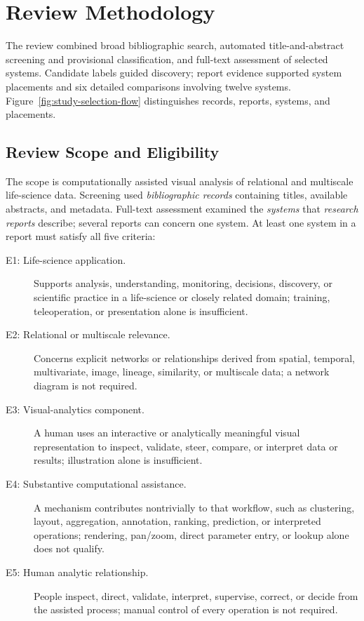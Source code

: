 \section{Review Methodology}
\label{sec:methodology}
The review combined broad bibliographic search, automated title-and-abstract screening and provisional classification, and full-text assessment of selected systems. Candidate labels guided discovery; report evidence supported system placements and six detailed comparisons involving twelve systems. Figure~\ref{fig:study-selection-flow} distinguishes records, reports, systems, and placements.

\subsection{Review Scope and Eligibility}
\label{sec:methodology-scope}
The scope is computationally assisted visual analysis of relational and multiscale life-science data. Screening used \emph{bibliographic records} containing titles, available abstracts, and metadata. Full-text assessment examined the \emph{systems} that \emph{research reports} describe; several reports can concern one system. At least one system in a report must satisfy all five criteria:

\begin{description}
\item[E1: Life-science application.] Supports analysis, understanding, monitoring, decisions, discovery, or scientific practice in a life-science or closely related domain; training, teleoperation, or presentation alone is insufficient.
\item[E2: Relational or multiscale relevance.] Concerns explicit networks or relationships derived from spatial, temporal, multivariate, image, lineage, similarity, or multiscale data; a network diagram is not required.
\item[E3: Visual-analytics component.] A human uses an interactive or analytically meaningful visual representation to inspect, validate, steer, compare, or interpret data or results; illustration alone is insufficient.
\item[E4: Substantive computational assistance.] A mechanism contributes nontrivially to that workflow, such as clustering, layout, aggregation, annotation, ranking, prediction, or interpreted operations; rendering, pan/zoom, direct parameter entry, or lookup alone does not qualify.
\item[E5: Human analytic relationship.] People inspect, direct, validate, interpret, supervise, correct, or decide from the assisted process; manual control of every operation is not required.

\end{description}

